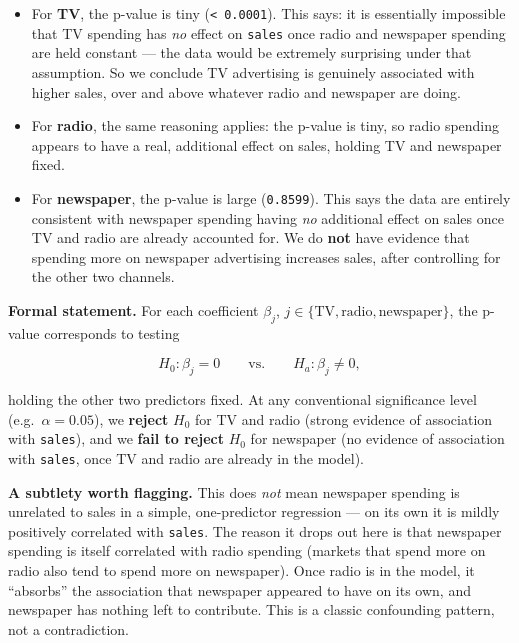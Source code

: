 \documentclass[
  11pt,
]{article}
\providecommand{\tightlist}{%
  \setlength{\itemsep}{0pt}\setlength{\parskip}{0pt}}
\begin{document}
\begin{itemize}
\tightlist
\item
  For \textbf{TV}, the p-value is tiny (\texttt{\textless{}\ 0.0001}).
  This says: it is essentially impossible that TV spending has \emph{no}
  effect on \texttt{sales} once radio and newspaper spending are held
  constant --- the data would be extremely surprising under that
  assumption. So we conclude TV advertising is genuinely associated with
  higher sales, over and above whatever radio and newspaper are doing.
\item
  For \textbf{radio}, the same reasoning applies: the p-value is tiny,
  so radio spending appears to have a real, additional effect on sales,
  holding TV and newspaper fixed.
\item
  For \textbf{newspaper}, the p-value is large (\texttt{0.8599}). This
  says the data are entirely consistent with newspaper spending having
  \emph{no} additional effect on sales once TV and radio are already
  accounted for. We do \textbf{not} have evidence that spending more on
  newspaper advertising increases sales, after controlling for the other
  two channels.
\end{itemize}

\textbf{Formal statement.} For each coefficient \(\beta_j\),
\(j \in \{\text{TV},
\text{radio}, \text{newspaper}\}\), the p-value corresponds to testing

\[
H_0 : \beta_j = 0 \qquad \text{vs.} \qquad H_a : \beta_j \neq 0,
\]

holding the other two predictors fixed. At any conventional significance
level (e.g.~\(\alpha = 0.05\)), we \textbf{reject} \(H_0\) for TV and
radio (strong evidence of association with \texttt{sales}), and we
\textbf{fail to reject} \(H_0\) for newspaper (no evidence of
association with \texttt{sales}, once TV and radio are already in the
model).

\textbf{A subtlety worth flagging.} This does \emph{not} mean newspaper
spending is unrelated to sales in a simple, one-predictor regression ---
on its own it is mildly positively correlated with \texttt{sales}. The
reason it drops out here is that newspaper spending is itself correlated
with radio spending (markets that spend more on radio also tend to spend
more on newspaper). Once radio is in the model, it ``absorbs'' the
association that newspaper appeared to have on its own, and newspaper
has nothing left to contribute. This is a classic confounding pattern,
not a contradiction.
\end{document}
